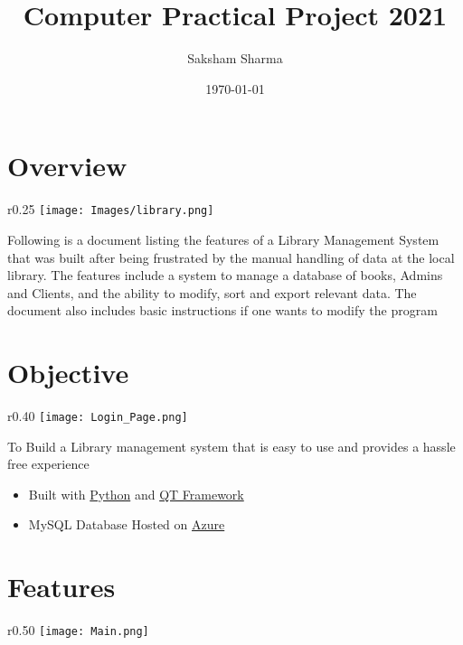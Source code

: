 \documentclass[landscape,a4paper,]{beamer}
\author{Saksham Sharma}
\date{\today}
\title{Computer Practical Project 2021}
\newcommand\myheading[1]{%
  \par\bigskip
  {\Large\bfseries#1}\par\smallskip}
\begin{document}
\maketitle
\tableofcontents
\newpage

\section{Overview}
\label{sec:orga8bb4a8}
\myheading{\insertsectionhead}

\begin{wrapfigure}{r}{0.25\textwidth}
    \texttt{[image: Images/library.png]}
    \label{fig:wrapfig}
\end{wrapfigure}

Following is a document listing the features of a Library Management System that was built after being frustrated by the manual handling of data at the local library. The features include a system to manage a database of books, Admins and Clients, and the ability to modify, sort and export relevant data.
The document also includes basic instructions if one wants to modify the program

\section{Objective}
\label{sec:orgbc0d5a6}
\myheading{\insertsectionhead}
\begin{wrapfigure}{r}{0.40\textwidth}
    \texttt{[image: Login\_Page.png]}
    \label{fig:wrapfig}
\end{wrapfigure}
To Build a Library management system that is easy to use and provides a hassle free experience
\begin{itemize}
\item Built with \href{https://www.python.org/}{Python} and \href{https://www.qt.io/}{QT Framework}
\item MySQL Database Hosted on \href{//azure.microsoft.com}{Azure}
\end{itemize}

\newpage

\section{Features}
\label{sec:org94e4192}
\myheading{\insertsectionhead}

\begin{wrapfigure}{r}{0.50\textwidth}
    \texttt{[image: Main.png]}
    \label{fig:wrapfig}
\end{wrapfigure}
\end{document}
